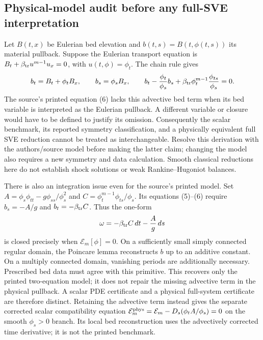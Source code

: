 \documentclass[11pt]{article}
\theoremstyle{definition}
\newcommand{\E}{\mathcal E}
\begin{document}
\subsection{Physical-model audit before any full-SVE interpretation}
Let $B(t,x)$ be Eulerian bed elevation and $b(t,s)=B(t,\phi(t,s))$ its
material pullback. Suppose the Eulerian transport equation is
$B_t+\beta_{\rm tr}u^{m-1}u_x=0$, with $u(t,\phi)=\phi_t$.
The chain rule gives
\begin{equation}
 b_t=B_t+\phi_tB_x,\qquad b_s=\phi_sB_x,
 \qquad
 b_t-\frac{\phi_t}{\phi_s}b_s
       +\beta_{\rm tr}\phi_t^{m-1}\frac{\phi_{ts}}{\phi_s}=0.
 \label{eq:physical-bed-audit}
\end{equation}
The source's printed equation (6) lacks this advective bed term when its bed
variable is interpreted as the Eulerian pullback. A different variable or
closure would have to be defined to justify its omission. Consequently the
scalar benchmark, its reported symmetry classification, and a physically
equivalent full SVE reduction cannot be treated as interchangeable. Resolve
this derivation with the authors/source model before making the latter claim;
changing the model also requires a new symmetry and data calculation.
Smooth classical reductions here do not establish shock solutions or weak
Rankine--Hugoniot balances.

There is also an integration issue even for the source's printed model.
Set $A=\phi_s\phi_{tt}-g\phi_{ss}/\phi_s^2$ and
$C=\phi_t^{m-1}\phi_{ts}/\phi_s$. Its equations (5)--(6) require
$b_s=-A/g$ and $b_t=-\beta_{\rm tr}C$. Thus the one-form
\[
 \omega=-\beta_{\rm tr}C\,dt-\frac{A}{g}\,ds
\]
is closed precisely when $\mathcal E_m[\phi]=0$. On a sufficiently small
simply connected regular domain, the Poincare lemma reconstructs $b$ up to
an additive constant. On a multiply connected domain, vanishing periods
are additionally necessary. Prescribed bed data must agree with this
primitive. This recovers only the printed two-equation model; it does not
repair the missing advective term in the physical pullback. A scalar PDE
certificate and a physical full-system certificate are therefore distinct.
Retaining the advective term instead gives the separate corrected scalar
compatibility equation
$\E_m^{\rm phys}=\E_m-D_s(\phi_tA/\phi_s)=0$
on the smooth $\phi_s>0$ branch. Its local bed reconstruction uses the
advectively corrected time derivative; it is not the printed benchmark.
\end{document}
